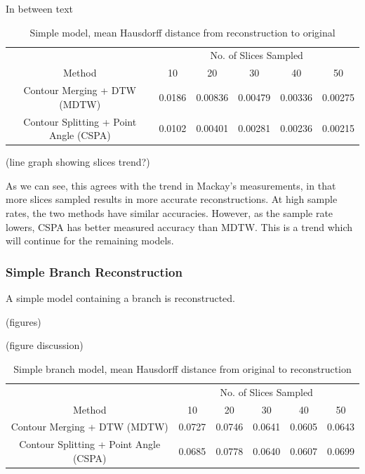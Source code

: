 \documentclass[11p, titlepage]{article}
\begin{document}
In between text

\begin{table}[h]
\begin{tabular}{ | c | c | c | c | c | c | }
\hline
& \multicolumn{5}{c|}{No. of Slices Sampled} \\
\cline{2-6}
Method & 10 & 20 & 30 & 40 & 50 \\
\hline
Contour Merging + DTW (MDTW) & 0.0186 & 0.00836 & 0.00479 & 0.00336 & 0.00275 \\
Contour Splitting + Point Angle (CSPA) & 0.0102 & 0.00401 & 0.00281 & 0.00236 & 0.00215 \\
\hline
\end{tabular}
\caption{Simple model, mean Hausdorff distance from reconstruction to original}
\label{table:simple_reverse}
\end{table}

(line graph showing slices trend?)

As we can see, this agrees with the trend in Mackay's measurements, in that more slices sampled results in more accurate reconstructions. At high sample rates, the two methods have similar accuracies. However, as the sample rate lowers, CSPA has better measured accuracy than MDTW. This is a trend which will continue for the remaining models.

\subsubsection{Simple Branch Reconstruction}

A simple model containing a branch is reconstructed.

(figures)

(figure discussion)

\begin{table}[h]
\begin{tabular}{ | c | c | c | c | c | c | }
\hline
& \multicolumn{5}{c|}{No. of Slices Sampled} \\
\cline{2-6}
Method & 10 & 20 & 30 & 40 & 50 \\
\hline
Contour Merging + DTW (MDTW) & 0.0727 & 0.0746 & 0.0641 & 0.0605 & 0.0643 \\
Contour Splitting + Point Angle (CSPA) & 0.0685 & 0.0778 & 0.0640 & 0.0607 & 0.0699 \\
\hline
\end{tabular}
\caption{Simple branch model, mean Hausdorff distance from original to reconstruction}
\label{table:simple_branch_forward}
\end{table}
\end{document}
